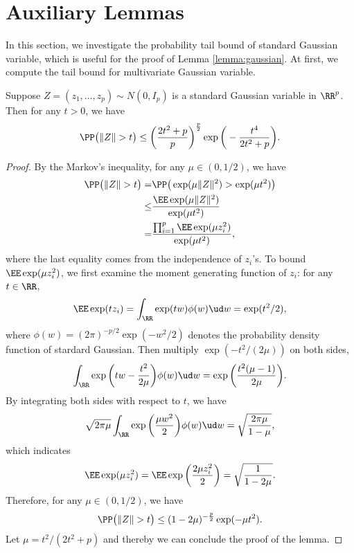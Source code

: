 \section{Auxiliary Lemmas}

In this section, we investigate the probability tail bound of standard Gaussian variable, which is useful for the proof of Lemma \ref{lemma:gaussian}.  At first, we compute the tail bound for multivariate Gaussian variable.
\begin{lemma}\label{lemma:gaussian-tail-1}
    Suppose $Z=(z_1,\ldots,z_p)\sim N(0,I_p)$ is a standard Gaussian variable in $\RR^p$. Then for any $t>0$, we have
    \begin{equation*}
       \PP\big( \|Z\| > t \big) \leq \bigg( \frac{2t^2 +p}{p} \bigg)^{\frac{p}{2}} \exp \bigg(-\frac{t^4}{2t^2+p} \bigg).
    \end{equation*}
\end{lemma}
\begin{proof}
    By the Markov's inequality, for any $\mu\in(0,1/2)$, we have
    \begin{align*}
        \PP\big( \|Z\| > t \big) =& \PP \big(\exp(\mu \|Z\|^2) > \exp(\mu t^2) \big) \\
        \leq & \frac{\EE \exp(\mu \|Z\|^2) }{\exp(\mu t^2)} \\
        =&  \frac{ \prod_{i=1}^p \EE \exp(\mu z_i^2) }{\exp(\mu t^2)} ,
    \end{align*}
    where the last equality comes from the independence of $z_i$'s.
To bound $\EE \exp(\mu z_i^2)$, we first examine the moment generating function of $z_i$: for any $t\in\RR$,
\begin{align*}
    \EE \exp(t z_i) = \int_\RR \exp(tw)\phi(w) \ud w = \exp(t^2/2),
\end{align*}
where $\phi(w)=(2\pi)^{-p/2} \exp(-w^2/2)$ denotes the probability density function of stardard Gaussian. Then multiply $\exp(-t^2/(2\mu))$ on both sides,
\begin{align*}
    \int_\RR \exp\bigg(tw-\frac{t^2}{2\mu} \bigg)\phi(w) \ud w = \exp\bigg(\frac{t^2(\mu-1)}{2\mu} \bigg).
\end{align*}
By integrating both sides with respect to $t$, we have
\begin{equation*}
    \sqrt{2\pi\mu}  \int_\RR \exp\bigg( \frac{\mu w^2}{2} \bigg)\phi(w) \ud w = \sqrt{\frac{2\pi\mu}{1-\mu} },
\end{equation*}
which indicates
\begin{align*}
    \EE \exp(\mu z_i^2) = \EE \exp\bigg( \frac{2\mu z_i^2}{2} \bigg) = \sqrt{\frac{1}{1-2\mu}}.
\end{align*}
Therefore, for any $\mu \in (0,1/2)$, we have
\begin{align*}
    \PP\big( \|Z\| > t \big) \leq (1-2\mu)^{-\frac{p}{2}}\exp(-\mu t^2).
\end{align*}
Let $\mu = t^2/(2t^2+p)$ and thereby we can conclude the proof of the lemma.

\end{proof}


